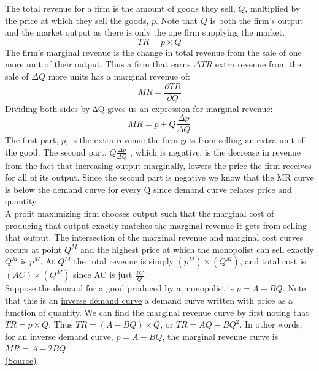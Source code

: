 \documentclass[a4paper, 12pt, reqno]{article}
\begin{document}
The total revenue for a firm is the amount of goods they sell, $Q$, multiplied by the price at which they sell the goods, $p$. Note that $Q$ is both the firm’s output and the market output as there is only the one firm supplying the market. 
$$ TR = p\times Q$$
The firm’s marginal revenue is the change in total revenue from the sale of one more unit of their output. Thus a firm that earns $\Delta TR$ extra revenue from the sale of $\Delta Q$ more units has a marginal revenue of: 
$$MR = \frac{\partial TR}{\partial Q}$$
Dividing both sides by ∆Q gives us an expression for marginal revenue:
$$MR= p+Q\frac{\Delta p}{\Delta Q}$$
The first part, $p$, is the extra revenue the firm gets from selling an extra unit of the good. The second part, $Q\frac{\Delta p}{\Delta Q}$ , which is negative, is the decrease in revenue from the fact that increasing output marginally, 
lowers the price the firm receives for all of its output. Since the second part is negative we know that the MR curve is below the demand curve for every Q since demand curve relates price and quantity. \\

A profit maximizing firm chooses output such that the marginal cost of producing that output exactly matches the marginal revenue it gets from selling that output. The intersection of the marginal revenue and marginal cost curves occurs at point $Q^M $ and the highest price at which the monopolist can sell exactly $Q^M $ is $p^M $. 
At $Q^M $ the total revenue is simply $(p^M ) \times (Q^M )$, and total cost is $(AC) \times (Q^M )$ since AC is just $\frac{TC}{Q}$. \\

Suppose the demand for a good produced by a monopolist is $p = A - BQ$. Note that this is an \underline{inverse demand curve} a demand curve written with price as a function of quantity. We can find the marginal revenue curve by first noting that $TR = p \times Q$. 
Thus $TR = (A - BQ) \times Q$, or $TR = AQ - BQ^{2}$. 
In other words, for an inverse demand curve, $p = A - BQ$, the marginal revenue curve is $MR = A - 2BQ$. \\

\href{https://open.oregonstate.education/intermediatemicroeconomics/chapter/module-15/}{(Source)}
\end{document}
